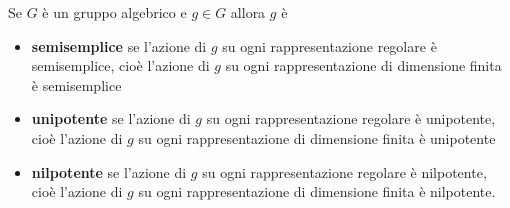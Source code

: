 \begin{definition}
Se $G$ \`e un gruppo algebrico e $g\in G$ allora $g$ \`e
\begin{itemize}
    \item \textbf{semisemplice} se l'azione di $g$ su ogni rappresentazione regolare \`e semisemplice, cio\`e l'azione di $g$ su ogni rappresentazione di dimensione finita \`e semisemplice
    \item \textbf{unipotente} se l'azione di $g$ su ogni rappresentazione regolare \`e unipotente, cio\`e l'azione di $g$ su ogni rappresentazione di dimensione finita \`e unipotente
    \item \textbf{nilpotente} se l'azione di $g$ su ogni rappresentazione regolare \`e nilpotente, cio\`e l'azione di $g$ su ogni rappresentazione di dimensione finita \`e nilpotente.
\end{itemize}
\end{definition}


